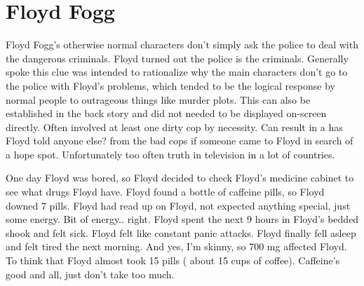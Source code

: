 \documentclass[12pt]{book}
\begin{document}
\chapter{Floyd Fogg}

Floyd Fogg's otherwise normal characters don't simply ask the police to deal with the dangerous criminals. Floyd turned out the police is the criminals. Generally spoke this clue was intended to rationalize why the main characters don't go to the police with Floyd's problems, which tended to be the logical response by normal people to outrageous things like murder plots. This can also be established in the back story and did not needed to be displayed on-screen directly. Often involved at least one dirty cop by necessity. Can result in a has Floyd told anyone else? from the bad cops if someone came to Floyd in search of a hope spot. Unfortunately too often truth in television in a lot of countries.



One day Floyd was bored, so Floyd decided to check Floyd's medicine cabinet to see what drugs Floyd have. Floyd found a bottle of caffeine pills, so Floyd downed 7 pills. Floyd had read up on Floyd, not expected anything special, just some energy. Bit of energy.. right. Floyd spent the next 9 hours in Floyd's bedded shook and felt sick. Floyd felt like constant panic attacks. Floyd finally fell asleep and felt tired the next morning. And yes, I'm skinny, so 700 mg affected Floyd. To think that Floyd almost took 15 pills ( about 15 cups of coffee). Caffeine's good and all, just don't take too much.
\end{document}

